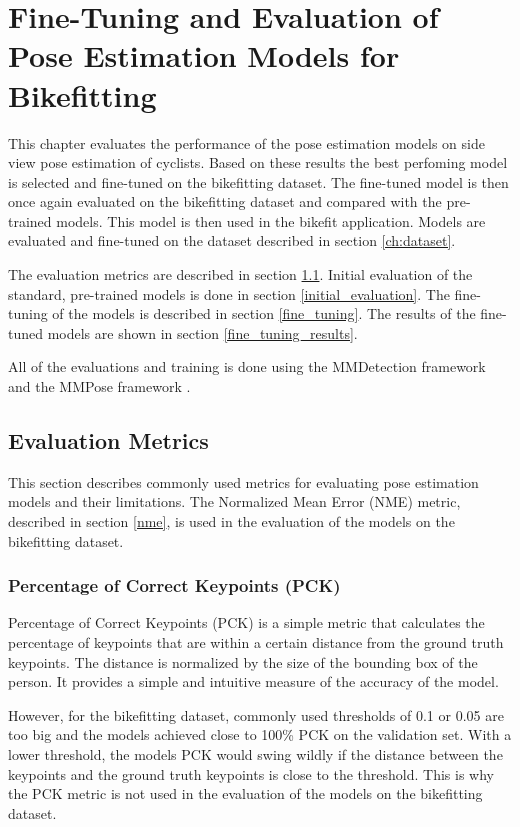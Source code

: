 
\chapter{Fine-Tuning and Evaluation of Pose Estimation Models for Bikefitting}
\label{ch:fine_tuning}

This chapter evaluates the performance of the pose estimation models on side view pose estimation of cyclists. Based on these results the best perfoming model is selected and fine-tuned on the bikefitting dataset. The fine-tuned model is then once again evaluated on the bikefitting dataset and compared with the pre-trained models. This model is then used in the bikefit application. Models are evaluated and fine-tuned on the dataset described in section \ref{ch:dataset}.

The evaluation metrics are described in section \ref{evaluation_metrics}. Initial evaluation of the standard, pre-trained models is done in section \ref{initial_evaluation}. The fine-tuning of the models is described in section \ref{fine_tuning}. The results of the fine-tuned models are shown in section \ref{fine_tuning_results}.

All of the evaluations and training is done using the MMDetection framework \cite{mmdetection} and the MMPose framework \cite{mmpose2020}.

\section{Evaluation Metrics}
\label{evaluation_metrics}
This section describes commonly used metrics for evaluating pose estimation models and their limitations. The Normalized Mean Error (NME) metric, described in section \ref{nme}, is used in the evaluation of the models on the bikefitting dataset.



\subsection{Percentage of Correct Keypoints (PCK)}
Percentage of Correct Keypoints (PCK) is a simple metric that calculates the percentage of keypoints that are within a certain distance from the ground truth keypoints. The distance is normalized by the size of the bounding box of the person. It provides a simple and intuitive measure of the accuracy of the model.

However, for the bikefitting dataset, commonly used thresholds of 0.1 or 0.05 are too big and the models achieved close to 100\% PCK on the validation set. With a lower threshold, the models PCK would swing wildly if the distance between the keypoints and the ground truth keypoints is close to the threshold. This is why the PCK metric is not used in the evaluation of the models on the bikefitting dataset.

